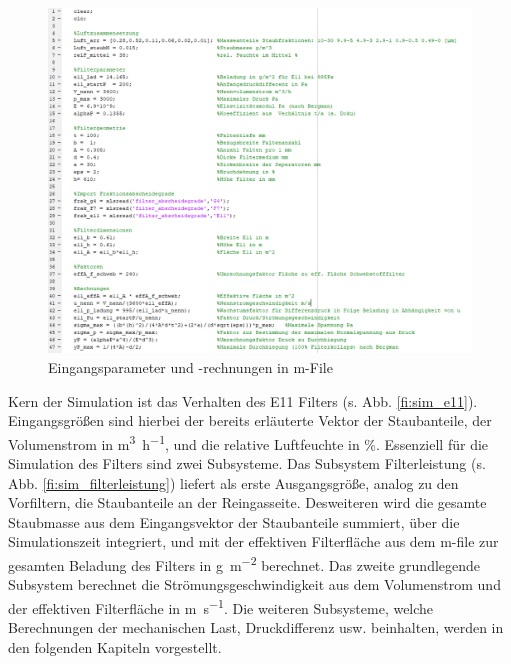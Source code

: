     \begin{figure}[H]
        \begin{center}
            \includegraphics[width=\linewidth]{images/mfile_parameter.png}
            \caption[M-file Simulink]{Eingangsparameter und -rechnungen in m-File}
            \label{fi:mfile_parameter}
        \end{center}
    \end{figure}
    Kern der Simulation ist das Verhalten des E11 Filters (s. Abb. \ref{fi:sim_e11}). Eingangsgrößen sind hierbei der bereits erläuterte Vektor der Staubanteile, der Volumenstrom in \si{\cubic\metre\per\hour}, und die relative Luftfeuchte in \%. Essenziell für die Simulation des Filters sind zwei Subsysteme. Das Subsystem Filterleistung (s. Abb. \ref{fi:sim_filterleistung}) liefert als erste Ausgangsgröße, analog zu den Vorfiltern, die Staubanteile an der Reingasseite. Desweiteren wird die gesamte Staubmasse aus dem Eingangsvektor der Staubanteile summiert, über die Simulationszeit integriert, und mit der effektiven Filterfläche aus dem m-file zur gesamten Beladung des Filters in \si{\gram\per\square\metre} berechnet. Das zweite grundlegende Subsystem berechnet die Strömungsgeschwindigkeit aus dem Volumenstrom und der effektiven Filterfläche in \si{\metre\per\second}.
    Die weiteren Subsysteme, welche Berechnungen der mechanischen Last, Druckdifferenz usw. beinhalten, werden in den folgenden Kapiteln vorgestellt.
